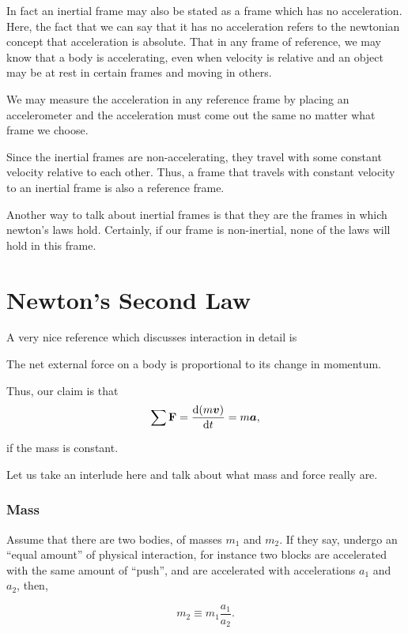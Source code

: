 In fact an inertial frame may also be stated as a frame which has no acceleration.
Here, the fact that we can say that it has no acceleration refers
to the newtonian concept that acceleration is absolute. That in any frame 
of reference, we may know that a body is accelerating, even when velocity is 
relative and an object may be at rest in certain frames and moving in others.

We may measure the acceleration in any reference frame by placing 
an accelerometer and the acceleration must come out the same no matter
what frame we choose.

Since the inertial frames are non-accelerating, they travel with some constant velocity 
relative to each other. Thus, a frame that travels with constant velocity 
to an inertial frame is also a reference frame.

Another way to talk about inertial frames is that they are the frames in which newton's laws
hold. Certainly, if our frame is non-inertial, none of the laws will hold in this frame.

\section{Newton's Second Law}
\label{sec: newton's second law}
A very nice reference which discusses interaction in detail is \cite{kleppner}

\begin{axioms}
     The net external force on a body is proportional to its change in 
    momentum.
\end{axioms}

Thus, our claim is that
\[\sum \mathbf{F} = \dv{(m\boldsymbol{v})}{t} = m\boldsymbol{a},\]

if the mass is constant. 

Let us take an interlude here and talk about what mass and force really are.

\subsubsection{Mass}

Assume that there are two bodies, of masses \(m_1\) and \(m_2\).
If they say, undergo an ``equal amount'' of physical interaction,
for instance two blocks are accelerated with the same amount 
of ``push'', and are accelerated with accelerations \(a_1\) and \(a_2\),
then,

\[m_2 \equiv m_1\frac{a_1}{a_2}.\]


